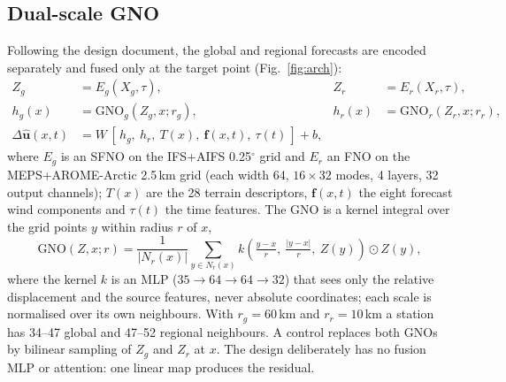 \documentclass[10pt,a4paper]{article}
\begin{document}
\subsection{Dual-scale GNO}
Following the design document, the global and regional forecasts are encoded separately and
fused only at the target point (Fig.~\ref{fig:arch}):
\begin{align}
Z_g &= E_g(X_g,\tau), & Z_r &= E_r(X_r,\tau),\\
h_g(x) &= \mathrm{GNO}_g(Z_g,x;r_g), & h_r(x) &= \mathrm{GNO}_r(Z_r,x;r_r),\\
\Delta\hat{\mathbf u}(x,t) &= W\,[\,h_g,\ h_r,\ T(x),\ \mathbf f(x,t),\ \tau(t)\,] + b, &&
\end{align}
where $E_g$ is an SFNO on the IFS+AIFS 0.25$^\circ$ grid and $E_r$ an FNO on the MEPS+AROME-Arctic
2.5\,km grid (each width 64, $16\times32$ modes, 4 layers, 32 output channels);
$T(x)$ are the 28 terrain descriptors, $\mathbf f(x,t)$ the eight forecast wind components and
$\tau(t)$ the time features. The GNO is a kernel integral over the grid points $y$ within radius
$r$ of $x$,
\begin{equation}
\mathrm{GNO}(Z,x;r)=\frac{1}{|N_r(x)|}\sum_{y\in N_r(x)} k\!\left(\tfrac{y-x}{r},\ \tfrac{|y-x|}{r},\ Z(y)\right)\odot Z(y),
\end{equation}
where the kernel $k$ is an MLP ($35\rightarrow64\rightarrow64\rightarrow32$) that sees only the
relative displacement and the source features, never absolute coordinates; each scale is
normalised over its own neighbours. With $r_g=60$\,km and $r_r=10$\,km a station has 34--47
global and 47--52 regional neighbours. A control replaces
both GNOs by bilinear sampling of $Z_g$ and $Z_r$ at $x$. The design deliberately has no fusion
MLP or attention: one linear map produces the residual.
\end{document}
